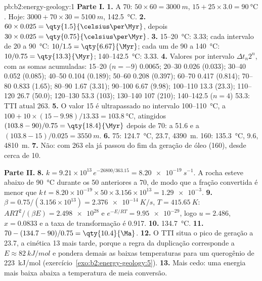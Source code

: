 \begin{solution}{pb:b2:energy-geology:1}
\noindent\textbf{Parte I.}
\textbf{1.} A \qty{70}{\Ma}: $50 \times 60 = \qty{3000}{m}$, $15 + 25 \times 3.0 =
\qty{90}{\celsius}$. Hoje: $3000 + 70 \times 30 = \qty{5100}{m}$, \qty{142.5}{\celsius}.
\textbf{2.} $60 \times 0.025 = \qty{1.5}{\celsius\per\Myr}$, depois $30 \times 0.025 =
\qty{0.75}{\celsius\per\Myr}$.
\textbf{3.} 15--\qty{20}{\celsius}: \qty{3.33}{\Myr}; cada intervalo de 20 a \qty{90}{\celsius}:
$10/1.5 = \qty{6.67}{\Myr}$; cada um de 90 a \qty{140}{\celsius}: $10/0.75 = \qty{13.3}{\Myr}$;
140--\qty{142.5}{\celsius}: \qty{3.33}{\Myr}.
\textbf{4.} Valores por intervalo $\Delta t_n 2^n$, com as somas acumuladas: 15--20 ($n = -9$) 0.0065; 20--30
0.026 (0.033); 30--40 0.052 (0.085); 40--50 0.104 (0.189); 50--60 0.208 (0.397); 60--70 0.417
(0.814); 70--80 0.833 (1.65); 80--90 1.67 (3.31); 90--100 6.67 (9.98); 100--110 13.3 (23.3);
110--120 26.7 (50.0); 120--130 53.3 (103); 130--140 107 (210); 140--142.5 ($n = 4$) 53.3: TTI
atual 263.
\textbf{5.} O valor 15 é ultrapassado no intervalo 100--\qty{110}{\celsius}, a $100 + 10 \times
(15 - 9.98)/13.33 = \qty{103.8}{\celsius}$, atingidos $(103.8 - 90)/0.75 = \qty{18.4}{\Myr}$ depois de
\qty{70}{\Ma}: a \qty{51.6}{\Ma} e a $(103.8 - 15)/0.025 = \qty{3550}{m}$.
\textbf{6.} 75: \qty{124.7}{\celsius}, \qty{23.7}{\Ma}, \qty{4390}{m}. 160: \qty{135.3}{\celsius},
\qty{9.6}{\Ma}, \qty{4810}{m}.
\textbf{7.} Não: com 263 ela já passou do fim da geração de óleo (160), desde cerca de \qty{10}{\Ma}.

\noindent\textbf{Parte II.}
\textbf{8.} $k = 9.21 \times 10^{13}\,e^{-26800/363.15} = \qty{8.20e-19}{s^{-1}}$. A rocha esteve
abaixo de \qty{90}{\celsius} durante os \qty{50}{\Myr} anteriores a \qty{70}{\Ma}, de modo que a fração convertida é
menor que $k\,t = 8.20 \times 10^{-19} \times 50 \times 3.156 \times 10^{13} = \num{1.29e-3}$.
\textbf{9.} $\beta = 0.75/(3.156 \times 10^{13}) = \qty{2.376e-14}{K/s}$, $T = \qty{415.65}{K}$:
$ART^2/(\beta E) = \num{2.498e28}$ e $e^{-E/RT} = \num{9.95e-29}$, logo $u = 2.486$, $x = 0.0833$ e
a taxa de transformação é 0.917.
\textbf{10.} \qty{134.7}{\celsius}.
\textbf{11.} $70 - (134.7 - 90)/0.75 = \qty{10.4}{\Ma}$.
\textbf{12.} O TTI situa o pico de geração a \qty{23.7}{\Ma}, a cinética \qty{13}{\Myr} mais tarde,
porque a regra da duplicação corresponde a $E \approx \qty{82}{kJ/mol}$ e pondera demais as baixas
temperaturas para um querogênio de \qty{223}{kJ/mol} (exercício~\ref{exo:b2:energy-geology:5}).
\textbf{13.} Mais cedo: uma energia mais baixa abaixa a temperatura de meia conversão.


\end{solution}

